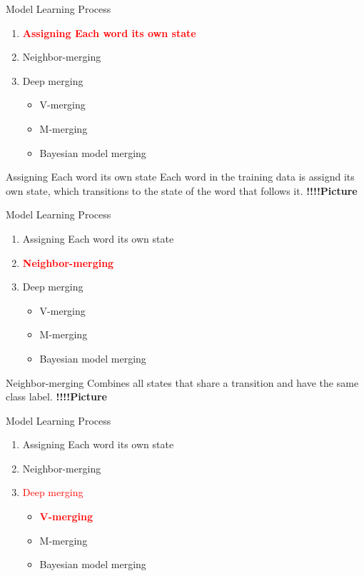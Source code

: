 \documentclass{beamer}
\begin{document}
\begin{frame}{Model Learning Process}
    \begin{enumerate}
        \item \textcolor{red} {\textbf{Assigning Each word its own state}}
        \item Neighbor-merging
        \item Deep merging
            \begin{itemize}
                \item V-merging
                \item M-merging
                \item Bayesian model merging
            \end{itemize}
    \end{enumerate}
\end{frame}

\begin{frame}{Assigning Each word its own state}
    Each word in the training data is assignd its own state, which transitions to the state of the word that follows it.
    \textbf{!!!!Picture}
\end{frame}

\begin{frame}{Model Learning Process}
    \begin{enumerate}
        \item Assigning Each word its own state
        \item \textcolor{red} {\textbf{Neighbor-merging}}
        \item Deep merging
            \begin{itemize}
                \item V-merging
                \item M-merging
                \item Bayesian model merging
            \end{itemize}
    \end{enumerate}
\end{frame}

\begin{frame}{Neighbor-merging}
    Combines all states that share a transition and have the same class label.    
    \textbf{!!!!Picture}
\end{frame}

\begin{frame}{Model Learning Process}
    \begin{enumerate}
        \item Assigning Each word its own state
        \item Neighbor-merging
        \item \textcolor{red} {Deep merging}
            \begin{itemize}
                \item \textcolor{red} {\textbf{ V-merging}}
                \item M-merging
                \item Bayesian model merging
            \end{itemize}
    \end{enumerate}
\end{frame}
\end{document}
